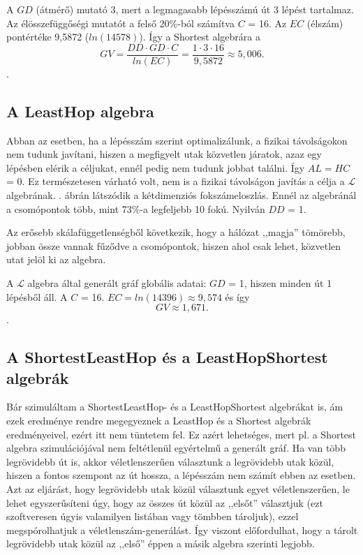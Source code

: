   A $GD$ (átmérő) mutató 3, mert a legmagasabb lépésszámú út 3 lépést tartalmaz. Az élösszefüggőségi mutatót a felső 20\%-ból számítva $C$ = 16. Az $EC$ (élszám) pontértéke 9,5872 ($ln(14578)$). Így a Shortest algebrára a $$GV = \frac{DD \cdot GD \cdot C}{ln(EC)} = \frac{1 \cdot 3 \cdot 16}{9,5872} \approx 5,006.$$.

  \subsection{A LeastHop algebra}
  Abban az esetben, ha a lépésszám szerint optimalizálunk, a fizikai távolságokon nem tudunk javítani, hiszen a megfigyelt utak közvetlen járatok, azaz egy lépésben elérik a céljukat, ennél pedig nem tudunk jobbat találni. Így $AL=HC$ = 0. Ez természetesen várható volt, nem is a fizikai távolságon javítás a célja a $\mathcal{L}$ algebrának. . ábrán látszódik a kétdimenziós fokszámeloszlás. Ennél az algebránál a csomópontok több, mint 73\%-a legfeljebb 10 fokú. Nyilván $DD$ = 1.

  Az erősebb skálafüggetlenségből következik, hogy a hálózat ,,magja'' tömörebb, jobban össze vannak fűződve a csomópontok, hiszen ahol csak lehet, közvetlen utat jelöl ki az algebra.

  A $\mathcal{L}$ algebra által generált gráf globális adatai: $GD$ = 1, hiszen minden út 1 lépésből áll. A $C$ = 16. $EC=ln(14396) \approx 9,574$ és így $$GV \approx 1,671.$$.

  \subsection{A ShortestLeastHop és a LeastHopShortest algebrák}
  Bár szimuláltam a ShortestLeastHop- és a LeastHopShortest algebrákat is, ám ezek eredménye rendre megegyeznek a LeastHop és a Shortest algebrák eredményeivel, ezért itt nem tüntetem fel. Ez azért lehetséges, mert pl. a Shortest algebra szimulációjával nem feltétlenül egyértelmű a generált gráf. Ha van több legrövidebb út is, akkor véletlenszerűen választunk a legrövidebb utak közül, hiszen a fontos szempont az út hossza, a lépésszám nem számít ebben az esetben. Azt az eljárást, hogy legrövidebb utak közül választunk egyet véletlenszerűen, le lehet egyszerűsíteni úgy, hogy az összes út közül az ,,elsőt'' választjuk (ezt szoftveresen úgyis valamilyen listában vagy tömbben tároljuk), ezzel megspórolhatjuk a véletlenszám-generálást. Így viszont előfordulhat, hogy a tárolt legrövidebb utak közül az ,,első'' éppen a másik algebra szerinti legjobb.

